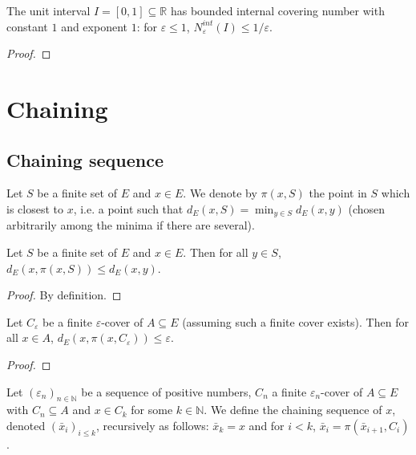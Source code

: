 \begin{lemma}\label{lem:hasBoundedInternalCoveringNumber_unitInterval}
The unit interval $I = [0, 1] \subseteq \mathbb{R}$ has bounded internal covering number with constant $1$ and exponent $1$: for $\varepsilon \le 1$, $N^{int}_\varepsilon(I) \le 1/\varepsilon$.
\end{lemma}

\begin{proof}

\end{proof}


\section{Chaining}

\subsection{Chaining sequence}


\begin{definition}\label{def:nearestPt}
Let $S$ be a finite set of $E$ and $x \in E$.
We denote by $\pi(x, S)$ the point in $S$ which is closest to $x$, i.e. a point such that $d_E(x, S) = \min_{y \in S} d_E(x, y)$ (chosen arbitrarily among the minima if there are several).
\end{definition}


\begin{lemma}\label{lem:dist_nearestPt_le}
Let $S$ be a finite set of $E$ and $x \in E$.
Then for all $y \in S$, $d_E(x, \pi(x, S)) \le d_E(x, y)$.
\end{lemma}

\begin{proof}
By definition.
\end{proof}


\begin{lemma}\label{lem:dist_nearestPt_of_isCover}
Let $C_\varepsilon$ be a finite $\varepsilon$-cover of $A \subseteq E$ (assuming such a finite cover exists).
Then for all $x \in A$, $d_E(x, \pi(x, C_\varepsilon)) \le \varepsilon$.
\end{lemma}

\begin{proof}

\end{proof}


\begin{definition}\label{def:chainingSequence}
Let $(\varepsilon_n)_{n \in \mathbb{N}}$ be a sequence of positive numbers, $C_n$ a finite $\varepsilon_n$-cover of $A \subseteq E$ with $C_n \subseteq A$ and $x \in C_k$ for some $k \in \mathbb{N}$.
We define the chaining sequence of $x$, denoted $(\bar{x}_i)_{i \le k}$, recursively as follows: $\bar{x}_k = x$ and for $i < k$, $\bar{x}_i = \pi(\bar{x}_{i+1}, C_i)$.
\end{definition}


